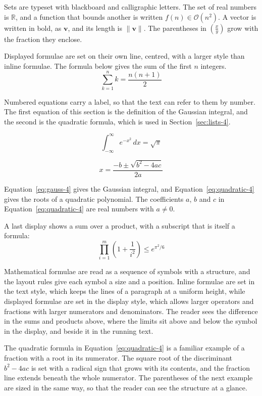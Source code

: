 \documentclass{article}
\begin{document}
Sets are typeset with blackboard and calligraphic letters. The set of real numbers is
$\mathbb{R}$, and a function that bounds another is written $f(n) \in \mathcal{O}(n^2)$.
A vector is written in bold, as $\mathbf{v}$, and its length is $\|\mathbf{v}\|$. The
parentheses in $\left( \frac{x}{y} \right)$ grow with the fraction they enclose.

Displayed formulae are set on their own line, centred, with a larger style than inline
formulae. The formula below gives the sum of the first $n$ integers.
\[
  \sum_{k=1}^{n} k = \frac{n(n+1)}{2}
\]

Numbered equations carry a label, so that the text can refer to them by number. The
first equation of this section is the definition of the Gaussian integral, and the
second is the quadratic formula, which is used in Section~\ref{sec:lists-4}.

\begin{equation}\label{eq:gauss-4}
  \int_{-\infty}^{\infty} e^{-x^{2}}\,dx = \sqrt{\pi}
\end{equation}

\begin{equation}\label{eq:quadratic-4}
  x = \frac{-b \pm \sqrt{b^{2}-4ac}}{2a}
\end{equation}

Equation~\ref{eq:gauss-4} gives the Gaussian integral, and
Equation~\ref{eq:quadratic-4} gives the roots of a quadratic polynomial. The coefficients
$a$, $b$ and $c$ in Equation~\ref{eq:quadratic-4} are real numbers with $a \neq 0$.

A last display shows a sum over a product, with a subscript that is itself a formula:
\[
  \prod_{i=1}^{m} \left( 1 + \frac{1}{i^{2}} \right) \leq e^{\pi^{2}/6}
\]

Mathematical formulae are read as a sequence of symbols with a structure, and the layout
rules give each symbol a size and a position. Inline formulae are set in the text style,
which keeps the lines of a paragraph at a uniform height, while displayed formulae are
set in the display style, which allows larger operators and fractions with larger
numerators and denominators. The reader sees the difference in the sums and products
above, where the limits sit above and below the symbol in the display, and beside it in
the running text.

The quadratic formula in Equation~\ref{eq:quadratic-4} is a familiar example of a
fraction with a root in its numerator. The square root of the discriminant
$b^{2}-4ac$ is set with a radical sign that grows with its contents, and the
fraction line extends beneath the whole numerator. The parentheses of the next example
are sized in the same way, so that the reader can see the structure at a glance.
\end{document}
